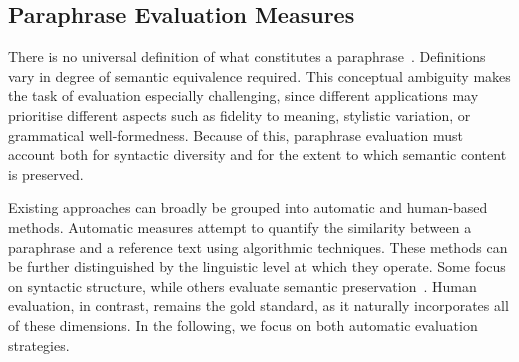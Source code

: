 
\subsection{Paraphrase Evaluation Measures}
\label{subsec:paraphrase_evaluation}

There is no universal definition of what constitutes a paraphrase~\citep{gohsen_task_oriented_2024}. 
Definitions vary in degree of semantic equivalence required. 
This conceptual ambiguity makes the task of evaluation especially challenging, since different applications may prioritise different aspects such as fidelity to meaning, stylistic variation, or grammatical well-formedness.
Because of this, paraphrase evaluation must account both for syntactic diversity and for the extent to which semantic content is preserved. 

Existing approaches can broadly be grouped into automatic and human-based methods. 
Automatic measures attempt to quantify the similarity between a paraphrase and a reference text using algorithmic techniques. 
These methods can be further distinguished by the linguistic level at which they operate. 
Some focus on syntactic structure, while others evaluate semantic preservation~\citep{gohsen_captions_2023}. 
Human evaluation, in contrast, remains the gold standard, as it naturally incorporates all of these dimensions.
In the following, we focus on both automatic evaluation strategies. 





